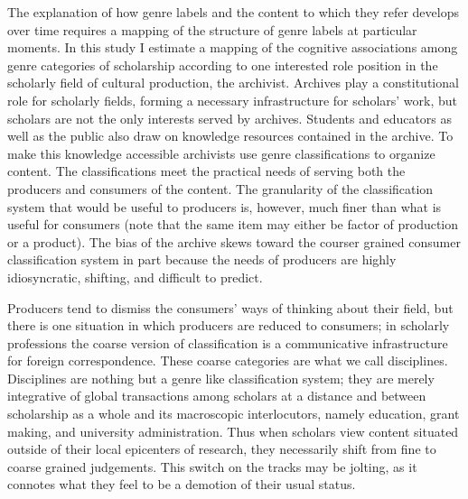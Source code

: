 \documentclass[]{book}
\theoremstyle{definition}
\theoremstyle{definition}
\theoremstyle{definition}
\theoremstyle{remark}
\begin{document}
The explanation of how genre labels and the content to which they refer
develops over time requires a mapping of the structure of genre labels
at particular moments. In this study I estimate a mapping of the
cognitive associations among genre categories of scholarship according
to one interested role position in the scholarly field of cultural
production, the archivist. Archives play a constitutional role for
scholarly fields, forming a necessary infrastructure for scholars' work,
but scholars are not the only interests served by archives. Students and
educators as well as the public also draw on knowledge resources
contained in the archive. To make this knowledge accessible archivists
use genre classifications to organize content. The classifications meet
the practical needs of serving both the producers and consumers of the
content. The granularity of the classification system that would be
useful to producers is, however, much finer than what is useful for
consumers (note that the same item may either be factor of production or
a product). The bias of the archive skews toward the courser grained
consumer classification system in part because the needs of producers
are highly idiosyncratic, shifting, and difficult to predict.

Producers tend to dismiss the consumers' ways of thinking about their
field, but there is one situation in which producers are reduced to
consumers; in scholarly professions the coarse version of classification
is a communicative infrastructure for foreign correspondence. These
coarse categories are what we call disciplines. Disciplines are nothing
but a genre like classification system; they are merely integrative of
global transactions among scholars at a distance and between scholarship
as a whole and its macroscopic interlocutors, namely education, grant
making, and university administration. Thus when scholars view content
situated outside of their local epicenters of research, they necessarily
shift from fine to coarse grained judgements. This switch on the tracks
may be jolting, as it connotes what they feel to be a demotion of their
usual status.
\end{document}
